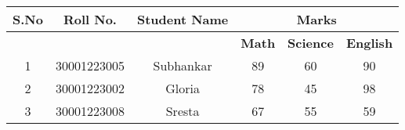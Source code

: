 \documentclass{article}
\begin{document}
\begin{tabular}{|c|c|c|c|c|c|}
\hline
\textbf{S.No} & \textbf{Roll No.} & \textbf{Student Name} & \multicolumn{3}{c|}{\textbf{Marks}} \\ \hline
              &              &                       & \textbf{Math} & \textbf{Science} & \textbf{English} \\ \hline
1             & 30001223005   & Subhankar                 & 89                & 60                & 90                \\ \hline
2             & 30001223002   &  Gloria                 & 78                & 45                & 98                \\ \hline
3             & 30001223008   & Sresta                 & 67                & 55                & 59                \\ \hline
\end{tabular}
\end{document}
